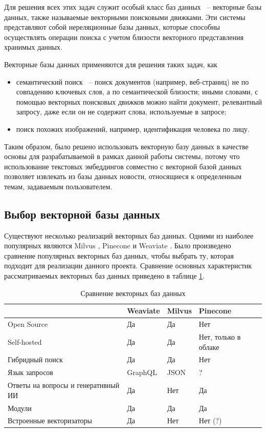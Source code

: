 Для решения всех этих задач служит особый класс баз данных ~-- векторные базы данных, также называемые векторными поисковыми движками. Эти системы представляют собой нереляционные базы данных, которые способны осуществлять операции поиска с учетом близости векторного представления хранимых данных.

Векторные базы данных применяются для решения таких задач, как
\begin{itemize}
    \item семантический поиск ~-- поиск документов (например, веб-страниц) не по совпадению ключевых слов, а по семантической близости; иными словами, с помощью векторных поисковых движков можно найти документ, релевантный запросу, даже если он не содержит слова, используемые в запросе;
    \item поиск похожих изображений, например, идентификация человека по лицу.
\end{itemize}

Таким образом, было решено использовать векторную базу данных в качестве основы для разрабатываемой в рамках данной работы системы, потому что использование текстовых эмбеддингов совместно с векторной базой данных позволяет извлекать из базы данных новости, относящиеся к определенным темам, задаваемым пользователем.

\subsection{Выбор векторной базы данных}

Существуют несколько реализаций векторных баз данных. Одними из наиболее популярных являются Milvus \cite{milvus}, Pinecone \cite{pinecone} и Weaviate \cite{weaviate}. Было произведено сравнение популярных векторных баз данных, чтобы выбрать ту, которая подходит для реализации данного проекта. Сравнение основных характеристик рассматриваемых векторных баз данных приведено в таблице \ref{tab:vector-db-compare}.

\begin{table}[ht]
    \caption{Сравнение векторных баз данных}
    \label{tab:vector-db-compare}
    \begin{tabularx}{\textwidth}{|l|X|X|X|}
        \hline
        & Weaviate & Milvus & Pinecone \\
        \hline
        Open Source & Да & Да & Нет \\
        \hline
        Self-hosted & Да & Да & Нет, только в облаке \\
        \hline
        Гибридный поиск & Да & Да & Нет \\
        \hline
        Язык запросов & GraphQL & JSON &  ? \\
        \hline
        Ответы на вопросы и генеративный ИИ & Да & Нет & Да \\
        \hline
        Модули & Да & Да & Да \\
        \hline
        Встроенные векторизаторы & Да & Нет & Нет (?) \\
        \hline
    \end{tabularx}
\end{table}

